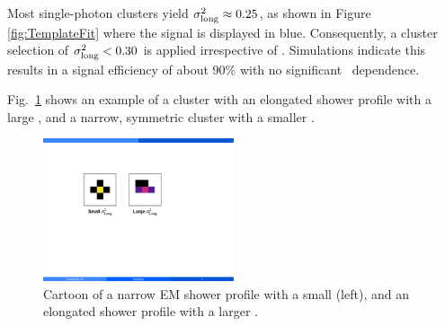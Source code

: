 Most single-photon clusters yield $\sigma^{2}_{\mathrm{long}}\approx 0.25$, as shown in Figure \ref{fig:TemplateFit} where the signal is displayed in blue. Consequently, a cluster selection of $\sigma^{2}_{\mathrm{long}}<0.30$ is applied irrespective of \pt. Simulations indicate this results in a signal efficiency of about 90$\%$ with no significant \pt~dependence.




Fig.~\ref{fig:sigma_long_shapes} shows an example of a cluster with an elongated shower profile with a large \lambdasquare, and a narrow, symmetric cluster with a smaller \lambdasquare.

\begin{figure}[htpb]
  \centering
  \includegraphics[width=0.5\textwidth]{Data_Analysis/sigma_long_shapes.pdf}
  \caption{Cartoon of a narrow EM shower profile with a small \lambdasquare (left), and an elongated shower profile with a larger \lambdasquare.}
  \label{fig:sigma_long_shapes}
\end{figure}

